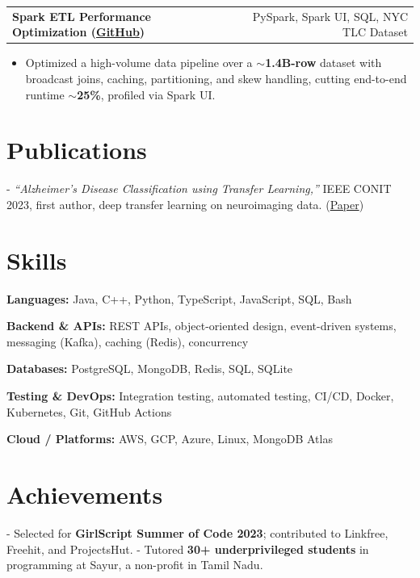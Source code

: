 \documentclass[letterpaper,11pt]{article}
\makeatletter
\newcommand{\projItem}[2]{%
  \vspace{6pt}
  \begin{tabular*}{\textwidth}{@{}l@{\extracolsep{\fill}}r@{}}
    \textbf{#1} & #2 \\
  \end{tabular*}\par\vspace{-2pt}
}
\newcommand{\skillLine}[2]{\textbf{#1:} #2\par\vspace{2pt}}
\newcommand{\inlineBlock}[1]{{\setlength{\leftskip}{0.18in}\small #1\par}}
\makeatother
\begin{document}
\projItem{Spark ETL Performance Optimization {\normalfont\small(\href{https://github.com/Deva-1903/Spark-ETL-Optimization}{GitHub})}}{PySpark, Spark UI, SQL, NYC TLC Dataset}
\begin{itemize}
  \item Optimized a high-volume data pipeline over a \textbf{$\sim$1.4B-row} dataset with broadcast joins, caching, partitioning, and skew handling, cutting end-to-end runtime \textbf{$\sim$25\%}, profiled via Spark UI.
\end{itemize}

\section{Publications}
\inlineBlock{- \textit{``Alzheimer's Disease Classification using Transfer Learning,''} IEEE CONIT 2023, first author, deep transfer learning on neuroimaging data. {\normalfont\small(\href{https://ieeexplore.ieee.org/document/10205760}{Paper})}}

\section{Skills}
\skillLine{Languages}{Java, C++, Python, TypeScript, JavaScript, SQL, Bash}
\skillLine{Backend \& APIs}{REST APIs, object-oriented design, event-driven systems, messaging (Kafka), caching (Redis), concurrency}
\skillLine{Databases}{PostgreSQL, MongoDB, Redis, SQL, SQLite}
\skillLine{Testing \& DevOps}{Integration testing, automated testing, CI/CD, Docker, Kubernetes, Git, GitHub Actions}
\skillLine{Cloud / Platforms}{AWS, GCP, Azure, Linux, MongoDB Atlas}

\section{Achievements}
\inlineBlock{- Selected for \textbf{GirlScript Summer of Code 2023}; contributed to Linkfree, Freehit, and ProjectsHut. - Tutored \textbf{30+ underprivileged students} in programming at Sayur, a non-profit in Tamil Nadu.}
\end{document}
